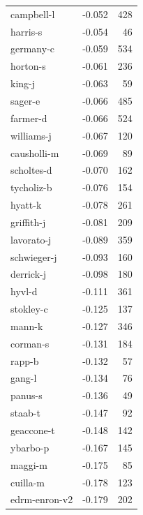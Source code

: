 \documentclass{vldb}
\begin{document}
\begin{appendix}
\begin{supertabular}{ l r r }
campbell-l     &                -0.052 &     428 \\
harris-s       &                -0.054 &      46 \\
germany-c      &                -0.059 &     534 \\
horton-s       &                -0.061 &     236 \\
king-j         &                -0.063 &      59 \\
sager-e        &                -0.066 &     485 \\
farmer-d       &                -0.066 &     524 \\
williams-j     &                -0.067 &     120 \\
causholli-m    &                -0.069 &      89 \\
scholtes-d     &                -0.070 &     162 \\
tycholiz-b     &                -0.076 &     154 \\
hyatt-k        &                -0.078 &     261 \\
griffith-j     &                -0.081 &     209 \\
lavorato-j     &                -0.089 &     359 \\
schwieger-j    &                -0.093 &     160 \\
derrick-j      &                -0.098 &     180 \\
hyvl-d         &                -0.111 &     361 \\
stokley-c      &                -0.125 &     137 \\
mann-k         &                -0.127 &     346 \\
corman-s       &                -0.131 &     184 \\
rapp-b         &                -0.132 &      57 \\
gang-l         &                -0.134 &      76 \\
panus-s        &                -0.136 &      49 \\
staab-t        &                -0.147 &      92 \\
geaccone-t     &                -0.148 &     142 \\
ybarbo-p       &                -0.167 &     145 \\
maggi-m        &                -0.175 &      85 \\
cuilla-m       &                -0.178 &     123 \\
edrm-enron-v2  &                -0.179 &     202 \\

\end{supertabular}
\end{appendix}
\end{document}
